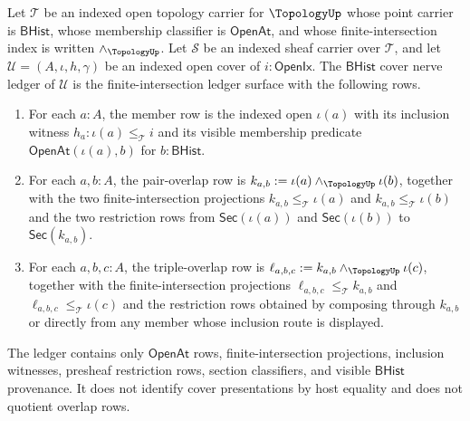 \begin{definition}
\label{def:sheaf-bhist-cover-nerve-ledger}
Let $\mathcal{T}$ be an indexed open topology carrier for $\TopologyUp$ whose point carrier is $\mathsf{BHist}$, whose membership classifier is $\mathsf{OpenAt}$, and whose finite-intersection index is written $\wedge_{\TopologyUp}$. Let $\mathcal{S}$ be an indexed sheaf carrier over $\mathcal{T}$, and let $\mathcal{U}=(A,\iota,h,\gamma)$ be an indexed open cover of $i:\mathsf{OpenIx}$. The $\mathsf{BHist}$ cover nerve ledger of $\mathcal{U}$ is the finite-intersection ledger surface with the following rows.
\begin{enumerate}
\item For each $a:A$, the member row is the indexed open $\iota(a)$ with its inclusion witness $h_a:\iota(a)\le_{\mathcal{T}}i$ and its visible membership predicate $\mathsf{OpenAt}(\iota(a),b)$ for $b:\mathsf{BHist}$.
\item For each $a,b:A$, the pair-overlap row is $k_{a,b}:=\iota(a)\wedge_{\TopologyUp}\iota(b)$, together with the two finite-intersection projections $k_{a,b}\le_{\mathcal{T}}\iota(a)$ and $k_{a,b}\le_{\mathcal{T}}\iota(b)$ and the two restriction rows from $\mathsf{Sec}(\iota(a))$ and $\mathsf{Sec}(\iota(b))$ to $\mathsf{Sec}(k_{a,b})$.
\item For each $a,b,c:A$, the triple-overlap row is $\ell_{a,b,c}:=k_{a,b}\wedge_{\TopologyUp}\iota(c)$, together with the finite-intersection projections $\ell_{a,b,c}\le_{\mathcal{T}}k_{a,b}$ and $\ell_{a,b,c}\le_{\mathcal{T}}\iota(c)$ and the restriction rows obtained by composing through $k_{a,b}$ or directly from any member whose inclusion route is displayed.
\end{enumerate}
The ledger contains only $\mathsf{OpenAt}$ rows, finite-intersection projections, inclusion witnesses, presheaf restriction rows, section classifiers, and visible $\mathsf{BHist}$ provenance. It does not identify cover presentations by host equality and does not quotient overlap rows.
\end{definition}

